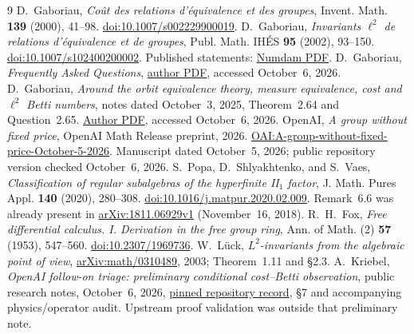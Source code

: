 \documentclass[11pt]{article}
\theoremstyle{remark}\newtheorem{remark}[theorem]{Remark}
\begin{document}
\begin{thebibliography}{9}
 D.~Gaboriau, \emph{Co\^ut des relations d'\'equivalence et des groupes}, Invent. Math. \textbf{139} (2000), 41--98. \href{https://doi.org/10.1007/s002229900019}{doi:10.1007/s002229900019}.
 D.~Gaboriau, \emph{Invariants $\ell^2$ de relations d'\'equivalence et de groupes}, Publ. Math. IH\'ES \textbf{95} (2002), 93--150. \href{https://doi.org/10.1007/s102400200002}{doi:10.1007/s102400200002}. Published statements: \href{https://numdam.org/item/10.1007/s102400200002.pdf}{Numdam PDF}.
 D.~Gaboriau, \emph{Frequently Asked Questions}, \href{https://perso.ens-lyon.fr/gaboriau/Travaux-Publi/FAQ.pdf}{author PDF}, accessed October~6, 2026.
 D.~Gaboriau, \emph{Around the orbit equivalence theory, measure equivalence, cost and $\ell^2$ Betti numbers}, notes dated October~3, 2025, Theorem~2.64 and Question~2.65. \href{https://perso.ens-lyon.fr/gaboriau/Travaux-Publi/ME-Cost-L2-Lectures/ME-Cost-L2-lectures.pdf}{Author PDF}, accessed October~6, 2026.
 OpenAI, \emph{A group without fixed price}, OpenAI Math Release preprint, 2026. \href{https://github.com/openai/math/blob/adc7f1241b42e322a6451854ab7e4b4c146bf78a/preprints/A-group-without-fixed-price-October-5-2026/unequal-costs-rank-100-amalgam.pdf}{OAI:A-group-without-fixed-price-October-5-2026}. Manuscript dated October~5, 2026; public repository version checked October~6, 2026.
 S.~Popa, D.~Shlyakhtenko, and S.~Vaes, \emph{Classification of regular subalgebras of the hyperfinite II$_1$ factor}, J. Math. Pures Appl. \textbf{140} (2020), 280--308. \href{https://doi.org/10.1016/j.matpur.2020.02.009}{doi:10.1016/j.matpur.2020.02.009}. Remark~6.6 was already present in \href{https://arxiv.org/abs/1811.06929v1}{arXiv:1811.06929v1} (November~16, 2018).
 R.~H.~Fox, \emph{Free differential calculus. I. Derivation in the free group ring}, Ann. of Math. (2) \textbf{57} (1953), 547--560. \href{https://doi.org/10.2307/1969736}{doi:10.2307/1969736}.
 W.~L\"uck, \emph{$L^2$-invariants from the algebraic point of view}, \href{https://arxiv.org/abs/math/0310489}{arXiv:math/0310489}, 2003; Theorem~1.11 and \S2.3.
 A.~Kriebel, \emph{OpenAI follow-on triage: preliminary conditional cost--Betti observation}, public research notes, October~6, 2026, \href{https://github.com/AlecKriebel/Math/tree/387962dc519c86b1d1833cb0a41bd3fbddd2b446/openai_followon_triage_20261006}{pinned repository record}, \S7 and accompanying physics/operator audit. Upstream proof validation was outside that preliminary note.
\end{thebibliography}
\end{document}
